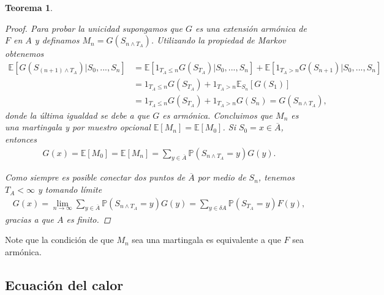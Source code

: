 \documentclass{article}
\newtheorem{teorema}[theorem]{Teorema}
\numberwithin{equation}{section}
\begin{document}
\begin{teorema}
\begin{proof}
    Para probar la unicidad supongamos que $G$ es una extensión armónica de $F$ en $A$ y definamos $M_n = G(S_{n \land T_A})$. Utilizando la  propiedad de Markov obtenemos
    \begin{align*}
        \mathbb{E}\left[G(S_{(n+1)\land T_A}) | S_0,...,S_n\right] &=\mathbb{E}\left[ 1_{T_A\leq n}G(S_{ T_A}) | S_0,...,S_n\right]+\mathbb{E}\left[1_{T_A> n}G(S_{n+1}) | S_0,...,S_n\right]\\
        &= 1_{T_A\leq n}G(S_{T_A}) + 1_{T_A> n}\mathbb{E}_{S_n}\left[G(S_1)\right] \\
        &= 1_{T_A\leq n}G(S_{T_A}) + 1_{T_A> n}G(S_n)
        = G(S_{n\land T_A}),
    \end{align*}
    donde la última igualdad se debe a que $G$ es armónica.
    Concluimos que $M_n$ es una martingala y por muestro opcional  $\mathbb{E}\left[M_n\right] = \mathbb{E}\left[M_0\right]$. Si $S_0 = x \in \overline{A}$, entonces
    \begin{align*}
        G(x) = \mathbb{E}\left[M_0\right] = \mathbb{E}\left[M_n\right] = \sum_{y \in \overline{A}}\mathbb{P}(S_{n\land T_A} = y)G(y).
    \end{align*}

    Como siempre es posible conectar dos puntos de $\overline{A}$ por medio de $S_n$, tenemos $T_A<\infty$ y tomando límite
    \begin{align*}
        G(x) = \lim_{n\to \infty}\sum_{y \in \overline{A}}\mathbb{P}(S_{n\land T_A} = y)G(y) = \sum_{y \in \delta A}\mathbb{P}(S_{T_A} = y)F(y),
    \end{align*}
    gracias a que $A$ es finito.
    \end{proof}
\end{teorema}

Note que la condición de que $M_n$ sea una martingala es equivalente a que $F$ sea armónica.



\subsection{Ecuación del calor}
\end{document}
